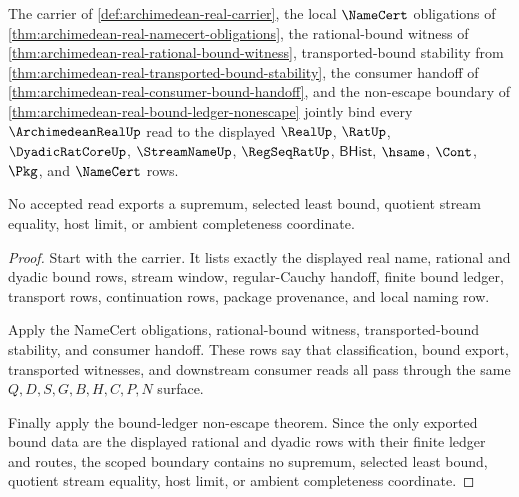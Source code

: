 \begin{theorem}
\label{thm:archimedean-real-scope-closure}
The carrier of \autoref{def:archimedean-real-carrier}, the local $\NameCert$ obligations of \autoref{thm:archimedean-real-namecert-obligations}, the rational-bound witness of \autoref{thm:archimedean-real-rational-bound-witness}, transported-bound stability from \autoref{thm:archimedean-real-transported-bound-stability}, the consumer handoff of \autoref{thm:archimedean-real-consumer-bound-handoff}, and the non-escape boundary of \autoref{thm:archimedean-real-bound-ledger-nonescape} jointly bind every $\ArchimedeanRealUp$ read to the displayed $\RealUp$, $\RatUp$, $\DyadicRatCoreUp$, $\StreamNameUp$, $\RegSeqRatUp$, $\mathsf{BHist}$, $\hsame$, $\Cont$, $\Pkg$, and $\NameCert$ rows.

No accepted read exports a supremum, selected least bound, quotient stream equality, host limit, or ambient completeness coordinate.
\end{theorem}
\begin{proof}
Start with the carrier. It lists exactly the displayed real name, rational and dyadic bound rows, stream window, regular-Cauchy handoff, finite bound ledger, transport rows, continuation rows, package provenance, and local naming row.

Apply the NameCert obligations, rational-bound witness, transported-bound stability, and consumer handoff. These rows say that classification, bound export, transported witnesses, and downstream consumer reads all pass through the same $Q,D,S,G,B,H,C,P,N$ surface.

Finally apply the bound-ledger non-escape theorem. Since the only exported bound data are the displayed rational and dyadic rows with their finite ledger and routes, the scoped boundary contains no supremum, selected least bound, quotient stream equality, host limit, or ambient completeness coordinate.
\end{proof}

